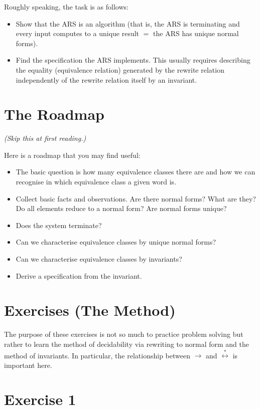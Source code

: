 \documentclass[12pt]{article}
\begin{document}
Roughly speaking, the task is as follows:

\begin{itemize}
    \item Show that the ARS is an algorithm (that is, the ARS is terminating and every input computes to a unique result $=$ the ARS has unique normal forms).
    \item Find the specification the ARS implements. This usually requires describing the equality (equivalence relation) generated by the rewrite relation independently of the rewrite relation itself by an invariant.
\end{itemize}

\section*{The Roadmap}

\textit{(Skip this at first reading.)}

Here is a roadmap that you may find useful:

\begin{itemize}
    \item The basic question is how many equivalence classes there are and how we can recognise in which equivalence class a given word is.
    \item Collect basic facts and observations. Are there normal forms? What are they? Do all elements reduce to a normal form? Are normal forms unique?
    \item Does the system terminate?
    \item Can we characterise equivalence classes by unique normal forms?
    \item Can we characterise equivalence classes by invariants?
    \item Derive a specification from the invariant.
\end{itemize}

\section*{Exercises (The Method)}

The purpose of these exercises is not so much to practice problem solving but rather to learn the method of decidability via rewriting to normal form and the method of invariants. 
In particular, the relationship between $\longrightarrow$ and $\stackrel{\ast}{\longleftrightarrow}$ is important here.

\section*{Exercise 1}
\end{document}
